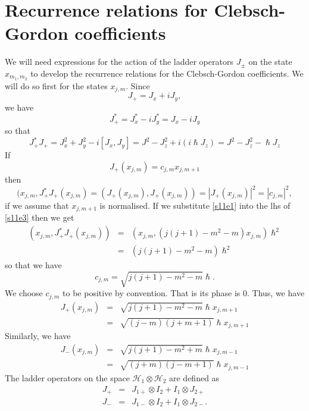 \documentclass{article}
\numberwithin{equation}{section}
\theoremstyle{plain}
\numberwithin{thm}{section}
\theoremstyle{plain}
\numberwithin{prop}{section}
\theoremstyle{definition}
\numberwithin{defn}{section}
\theoremstyle{remark}
\begin{document}
\section{Recurrence relations for Clebsch-Gordon coefficients}\label{s11}
We will need expressions for the action of the ladder operators $J_\pm$ on the
state $x_{m_1,m_2}$ to develop the recurrence relations for the Clebsch-Gordon
coefficients. We will do so first for the states $x_{j,m}$. Since
\[
J_+ = J_x + iJ_y,
\]
we have
\[
J_+^\ast = J_x^\ast - iJ_y^\ast = J_x - iJ_y
\]
so that
\begin{equation}\label{s11e1}
J_+^\ast J_+ = J_x^2 + J_y^2 -i[J_x, J_y] = J^2 - J_z^2 + i(i\hslash J_z)
= J^2 - J_z^2 - \hslash J_z
\end{equation}
If 
\begin{equation}\label{s11e2}
J_+(x_{j,m}) = c_{j,m}x_{j,m+1}
\end{equation} 
then 
\begin{equation}\label{s11e3}
(x_{j,m}, J_+^\ast J_+(x_{j,m}) = (J_+(x_{j,m}), J_+(x_{j,m})) = 
|J_+(x_{j,m})|^2 = |c_{j,m}|^2,
\end{equation}
if we assume that $x_{j,m+1}$ is normalised. If we substitute \eqref{s11e1}
into the lhs of \eqref{s11e3} then we get
\begin{eqnarray}
(x_{j,m}, J_+^\ast J_+(x_{j,m})) &=& 
 (x_{j,m}, (j(j+1) - m^2 - m)x_{j,m})\hslash^2 \nonumber \\
 &=& (j(j+1) - m^2 - m)\hslash^2 \label{s11e4} 
\end{eqnarray}
so that we have
\begin{equation}\label{s11e5}
c_{j,m} = \sqrt{j(j+1)-m^2-m}\hslash.
\end{equation}
We choose $c_{j,m}$ to be positive by convention. That is its phase is $0$.
Thus, we have
\begin{eqnarray}
J_+(x_{j,m}) &=& \sqrt{j(j+1)-m^2-m}\hslash x_{j,m+1} \nonumber \\
 &=& \sqrt{(j-m)(j+m+1)}\hslash x_{j,m+1} \label{s11e6}
\end{eqnarray}
Similarly, we have
\begin{eqnarray}
J_-(x_{j,m}) &=& \sqrt{j(j+1)-m^2+m}\hslash x_{j,m-1} \nonumber \\
 &=& \sqrt{(j+m)(j-m+1)}\hslash x_{j,m-1} \label{s11e7}
\end{eqnarray}
The ladder operators on the space $\mathcal{H}_1 \otimes \mathcal{H}_2$ are
defined as
\begin{eqnarray}
J_+ &=& J_{1+} \otimes I_2 + I_1 \otimes J_{2+} \label{s11e8} \\
J_- &=& J_{1-} \otimes I_2 + I_1 \otimes J_{2-}. \label{s11e9}
\end{eqnarray}
\end{document}
